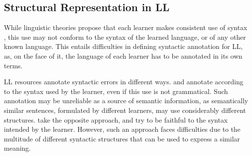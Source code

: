 \documentclass[letterpaper, 11pt]{article}
\begin{document}
%
%
%
\subsection{Structural Representation in LL}
%
While linguistic theories propose that each learner makes consistent use of syntax \cite{huebner1985system,tarone1983variability}, this use may not conform to the syntax of the learned language, or of any other known language. This entails difficulties in defining syntactic annotation for LL, as, on the face of it, the language of each learner has to be annotated in its own terms.

LL resources annotate syntactic errors in different ways.
 and 
annotate according to the syntax used
by the learner, even if this use is not grammatical.
Such annotation may be unreliable as a source of semantic information, as semantically similar sentences, formulated by different learners, may use considerably different structures.  take the opposite approach, and try to be faithful to the syntax intended by the learner. However, such an approach faces difficulties due to the multitude of different syntactic structures that can be used to express a similar meaning.
\end{document}
